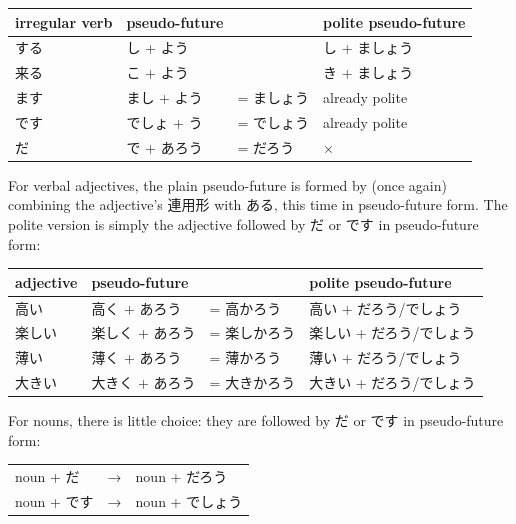 \documentclass[11pt, b5paper, twoside, openright, onecolumn]{book}
\newenvironment{mytabular}[1]{\noindent\hspace{0.4in}
\begin{tabular}[h]{#1}}{\end{tabular}}
\begin{document}
\smaller
\begin{mytabular}{| l  l  l  l |}\hline 
\rule{0pt}{2.4ex}irregular verb & pseudo-future &  & polite pseudo-future\\ 
\hline
\rule{0pt}{2.4ex}する & し + よう &  & し + ましょう\\ 
\rule{0pt}{2.4ex}来る & こ + よう &  & き + ましょう\\ 
\rule{0pt}{2.4ex}ます & まし + よう & = ましょう & already polite\\ 
\rule{0pt}{2.4ex}です & でしょ + う & = でしょう & already polite\\ 
\rule{0pt}{2.4ex}だ & で + あろう & = だろう & ×\\ 
\hline 
\end{mytabular}
\larger
\vspace{0.5cm}


For verbal adjectives‚ the plain pseudo-future is formed by (once again) combining the adjective’s 連用形 with ある‚ this time in pseudo-future form. The polite version is simply the adjective followed by だ or です in pseudo-future form:

\vspace{0.5cm}
\smaller
\begin{mytabular}{| l  l  l  l |}\hline 
\rule{0pt}{2.4ex}adjective & pseudo-future &  & polite pseudo-future\\ 
\hline
\rule{0pt}{2.4ex}高い & 高く + あろう & = 高かろう & 高い + だろう/でしょう\\ 
\rule{0pt}{2.4ex}楽しい & 楽しく + あろう & = 楽しかろう & 楽しい + だろう/でしょう\\ 
\rule{0pt}{2.4ex}薄い & 薄く + あろう & = 薄かろう & 薄い + だろう/でしょう\\ 
\rule{0pt}{2.4ex}大きい & 大きく + あろう & = 大きかろう & 大きい + だろう/でしょう\\ 
\hline 
\end{mytabular}
\larger
\vspace{0.5cm}


For nouns‚ there is little choice: they are followed by だ or です in pseudo-future form:

\vspace{0.5cm}
\smaller
\begin{mytabular}{| l  l  l |}\hline 
\rule{0pt}{2.4ex}noun + だ & → & noun + だろう\\ 
\rule{0pt}{2.4ex}noun + です & → & noun + でしょう\\ 
\hline 
\end{mytabular}
\larger
\vspace{0.5cm}
\end{document}
